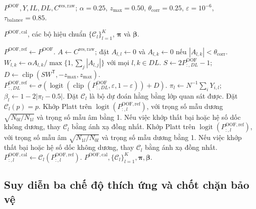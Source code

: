 \documentclass[11pt,a4paper]{article}
\newcounter{alg}
\begin{document}
\begin{algorithm}[H]
\caption{Ghép nối OS-NMF và học bộ hiệu chuẩn ba chế độ}
\label{alg:osnmf-calibration}
\footnotesize
\begin{algorithmic}[1]
\renewcommand{\algorithmicrequire}{\textbf{Đầu vào:}}
\renewcommand{\algorithmicensure}{\textbf{Đầu ra:}}
\REQUIRE \parbox[t]{0.82\linewidth}{\(P^{\mathrm{OOF}},Y,IL,DL,C^{\mathrm{res,raw}}\); \(\alpha=0.25\), \(z_{\max}=0.50\), \(\theta_{\mathrm{corr}}=0.25\), \(\varepsilon=10^{-6}\), \(\tau_{\mathrm{balance}}=0.85\).}
\ENSURE \parbox[t]{0.82\linewidth}{\(P^{\mathrm{OOF,cal}}\), các bộ hiệu chuẩn \(\{\mathcal C_l\}_{l=1}^{K}\), \(\boldsymbol\pi\) và \(\boldsymbol\beta\).}
\STATE \(P^{\mathrm{OOF,ref}}\gets P^{\mathrm{OOF}}\).
  \STATE \(A\gets C^{\mathrm{res,raw}}\); đặt \(A_{l,l}\gets0\) và \(A_{l,k}\gets0\) nếu \(|A_{l,k}|<\theta_{\mathrm{corr}}\).
  \STATE \(W_{l,k}\gets\alpha A_{l,k}/\max\{1,\sum_j|A_{l,j}|\}\) với mọi \(l,k\in DL\).
  \STATE \(S\gets2P^{\mathrm{OOF}}_{:,DL}-1\); \(D\gets\operatorname{clip}(SW^{\mathsf T},-z_{\max},z_{\max})\).
  \STATE \(P^{\mathrm{OOF,ref}}_{:,DL}\gets\sigma\!\left(\operatorname{logit}(\operatorname{clip}(P^{\mathrm{OOF}}_{:,DL},\varepsilon,1-\varepsilon))+D\right)\).
\ENDIF
{}
  \STATE \(\pi_l\gets N^{-1}\sum_iY_{i,l}\); \(\beta_l\gets1-2|\pi_l-0.5|\).
    \STATE Đặt \(\mathcal C_l\) là bộ dự đoán hằng bằng lớp quan sát được.
    \STATE Đặt \(\mathcal C_l(p)=p\).
    \STATE Khớp Platt trên \(\operatorname{logit}(P^{\mathrm{OOF,ref}}_{:,l})\), với trọng số mẫu dương \(\sqrt{N_{0l}/N_{1l}}\) và trọng số mẫu âm bằng 1.
    \STATE Nếu việc khớp thất bại hoặc hệ số dốc không dương, thay \(\mathcal C_l\) bằng ánh xạ đồng nhất.
  \ELSE
    \STATE Khớp Platt trên \(\operatorname{logit}(P^{\mathrm{OOF,ref}}_{:,l})\), với trọng số mẫu âm \(\sqrt{N_{1l}/N_{0l}}\) và trọng số mẫu dương bằng 1.
    \STATE Nếu việc khớp thất bại hoặc hệ số dốc không dương, thay \(\mathcal C_l\) bằng ánh xạ đồng nhất.
  \ENDIF
  \STATE \(P^{\mathrm{OOF,cal}}_{:,l}\gets\mathcal C_l(P^{\mathrm{OOF,ref}}_{:,l})\).
\ENDFOR
\RETURN \(P^{\mathrm{OOF,cal}},\{\mathcal C_l\}_{l=1}^{K},\boldsymbol\pi,\boldsymbol\beta\).
\end{algorithmic}
\end{algorithm}

\subsection{Suy diễn ba chế độ thích ứng và chốt chặn bảo vệ}
\end{document}
